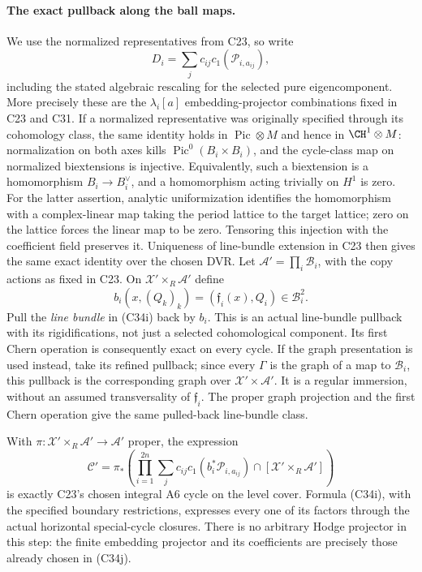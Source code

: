 \paragraph{The exact pullback along the ball maps.}
We use the normalized representatives
from C23, so write
\[
 D_i=\sum_j c_{ij}c_1(\mathcal P_{i,a_{ij}}),
                                                        \tag{C34j}
\]
including the stated algebraic
rescaling for the selected pure
eigencomponent. More precisely these
are the $\lambda_i[a]$ embedding-projector
combinations fixed in C23 and C31.
If a normalized representative was
originally specified through its
cohomology class, the same identity
holds in $\operatorname{Pic}\otimes M$
and hence in $\CH^1\otimes M$:
normalization on both axes kills
$\operatorname{Pic}^0(B_i\times B_i)$,
and the cycle-class map on normalized
biextensions is injective. Equivalently,
such a biextension is a homomorphism
$B_i\to B_i^\vee$, and a homomorphism
acting trivially on $H^1$ is zero.
For the latter assertion, analytic
uniformization identifies the
homomorphism with a complex-linear
map taking the period lattice to the
target lattice; zero on the lattice
forces the linear map to be zero.
Tensoring this injection with the
coefficient field preserves it.
Uniqueness of line-bundle extension
in C23 then gives the same exact
identity over the chosen DVR.
Let
$\mathcal A'=\prod_i\mathcal B_i$,
with the copy actions as fixed in
C23. On
$\mathcal X'\times_R\mathcal A'$
define
\[
 b_i(x,(Q_k)_k)=(\mathfrak f_i(x),Q_i)
                         \in\mathcal B_i^2.
                                                        \tag{C34k}
\]
Pull the \emph{line bundle} in (C34i)
back by $b_i$. This is an actual
line-bundle pullback with its
rigidifications, not just a selected
cohomological component. Its first
Chern operation is consequently
exact on every cycle. If the graph
presentation is used instead, take
its refined pullback; since every
$\Gamma$ is the graph of a map to
$\mathcal B_i$, this pullback is the
corresponding graph over
$\mathcal X'\times\mathcal A'$.
It is a regular immersion, without
an assumed transversality of
$\mathfrak f_i$. The proper graph
projection and the first Chern
operation give the same pulled-back
line-bundle class.

With $\pi:\mathcal X'\times_R\mathcal A'
\to\mathcal A'$ proper, the expression
\[
 \mathcal C'=\pi_*\left(
       \prod_{i=1}^{2n}
         \sum_jc_{ij}c_1(b_i^*\mathcal P_{i,a_{ij}})
       \cap[\mathcal X'\times_R\mathcal A']\right)
                                                        \tag{C34l}
\]
is exactly C23's chosen integral
A6 cycle on the level cover. Formula
(C34i), with the specified boundary
restrictions, expresses every one of
its factors through the actual
horizontal special-cycle closures.
There is no arbitrary Hodge projector
in this step: the finite embedding
projector and its coefficients are
precisely those already chosen in
(C34j).

